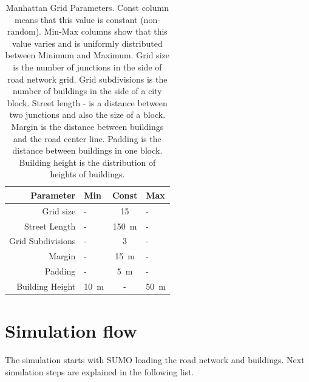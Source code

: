 \documentclass[]{nsm-thesis}
\begin{document}
\begin{table}
    \centering
    \begin{tabular}{rlcl}
        \toprule
        Parameter & Min & Const & Max \\
        \midrule
        	Grid size & - & 15 & - \\
        	Street Length & - & \SI{150}{\meter} & - \\
		Grid Subdivisions & - & 3 & - \\
		Margin & - & \SI{15}{\meter} & - \\
		Padding & - & \SI{5}{\meter} & - \\
		Building Height & \SI{10}{\meter} & - & \SI{50}{\meter} \\
        \bottomrule
    \end{tabular}
    \caption{Manhattan Grid Parameters. Const column means that this value is constant (non-random). Min-Max columns show that this value varies and is uniformly distributed between Minimum and Maximum. Grid size is the number of junctions in the side of road network grid. Grid subdivisions is the number of buildings in the side of a city block. Street length - is a distance between two junctions and also the size of a block. Margin is the distance between buildings and the road center line. Padding is the distance between buildings in one block. Building height is the distribution of heights of buildings. }
    \label{tab:manhattangrid}
\end{table}



\section {Simulation flow}

The simulation starts with SUMO loading the road network and buildings. Next simulation steps are explained in the following list.
\end{document}
